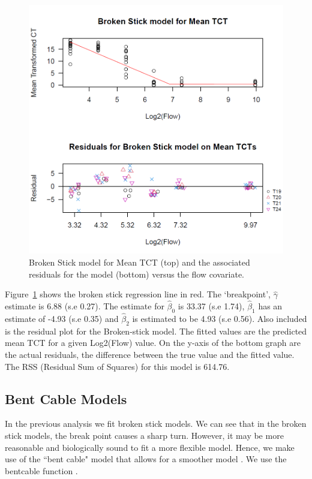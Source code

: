 \begin{figure}[H]
\includegraphics[scale=0.7]{Chapter4Images/meanbrokenstick.png}
\caption{Broken Stick model for Mean TCT (top) and the associated residuals for the model (bottom) versus the flow covariate.}
\label{fig:brokenstickmean}
\end{figure}



Figure~\ref{fig:brokenstickmean} shows the broken stick regression line in red. The `breakpoint', $\hat\gamma$  estimate is 6.88 (s.e 0.27). The estimate for $\hat\beta_{0}$ is 33.37 (s.e 1.74), $\hat\beta_{1}$ has an estimate of -4.93 (s.e 0.35) and $\hat\beta_{2}$ is estimated to be 4.93 (s.e 0.56). Also included is the residual plot for the Broken-stick model. The fitted values are the predicted mean TCT for a given Log2(Flow) value. On the y-axis of the bottom graph are the actual residuals, the difference between the true value and the fitted value. The RSS (Residual Sum of Squares) for this model is 614.76.



\subsection{Bent Cable Models}


 In the previous analysis we fit broken stick models. We can see that in the broken stick models, the break point causes a sharp turn. However, it may be more reasonable and biologically sound to fit a more flexible model. Hence, we make use of the ``bent cable" model that allows for a smoother model \citep{bentcable}. We use the bentcable function \citep{bentcable2}.
 
